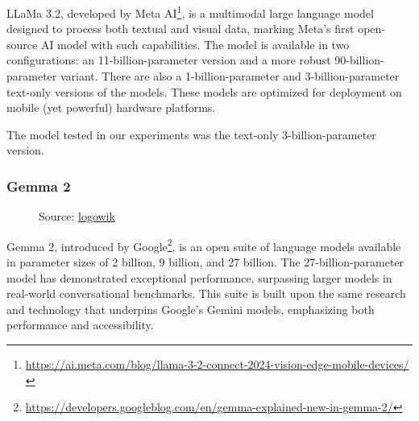 LLaMa 3.2, developed by Meta AI\footnote{\url{https://ai.meta.com/blog/llama-3-2-connect-2024-vision-edge-mobile-devices/}},
is a multimodal large language model designed to process both textual and visual
data, marking Meta's first open-source AI model with such capabilities. The model
is available in two configurations: an 11-billion-parameter version and a more
robust 90-billion-parameter variant. There are also a 1-billion-parameter and 3-billion-parameter
text-only versions of the models. These models are optimized for deployment on
mobile (yet powerful) hardware platforms.

The model tested in our experiments was the text-only 3-billion-parameter
version.
\vspace{8mm}
\subsubsection{Gemma 2}
\begin{figure}
  \centering
  \def\stackalignment{l}
  {\scriptsize \parbox[t]{\linewidth}{Source: \href{https://logowik.com/google-gemma-ai-logo-vector-71178.html}{logowik}}}
\end{figure}
Gemma 2, introduced by Google\footnote{\url{https://developers.googleblog.com/en/gemma-explained-new-in-gemma-2/}},
is an open suite of language models available in parameter sizes of 2 billion, 9
billion, and 27 billion. The 27-billion-parameter model has demonstrated exceptional
performance, surpassing larger models in real-world conversational benchmarks. This
suite is built upon the same research and technology that underpins Google's Gemini
models, emphasizing both performance and accessibility.

